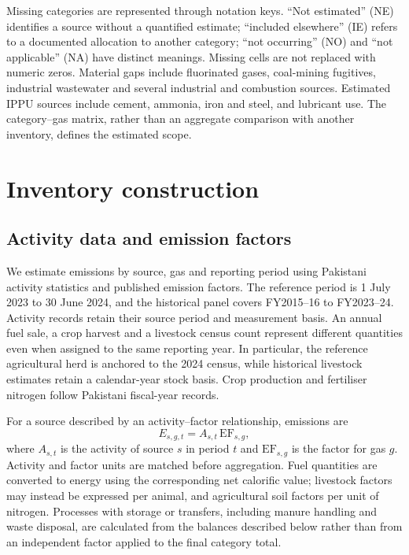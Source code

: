 \documentclass[essd]{copernicus}
\begin{document}
Missing categories are represented through notation keys. ``Not estimated'' (NE) identifies a source without a quantified estimate; ``included elsewhere'' (IE) refers to a documented allocation to another category; ``not occurring'' (NO) and ``not applicable'' (NA) have distinct meanings. Missing cells are not replaced with numeric zeros. Material gaps include fluorinated gases, coal-mining fugitives, industrial wastewater and several industrial and combustion sources. Estimated IPPU sources include cement, ammonia, iron and steel, and lubricant use. The category--gas matrix, rather than an aggregate comparison with another inventory, defines the estimated scope.

\section{Inventory construction}
\label{sec:methods}

\subsection{Activity data and emission factors}
\label{sec:activity_factors}

We estimate emissions by source, gas and reporting period using Pakistani activity statistics and published emission factors. The reference period is 1 July 2023 to 30 June 2024, and the historical panel covers FY2015--16 to FY2023--24. Activity records retain their source period and measurement basis. An annual fuel sale, a crop harvest and a livestock census count represent different quantities even when assigned to the same reporting year. In particular, the reference agricultural herd is anchored to the 2024 census, while historical livestock estimates retain a calendar-year stock basis. Crop production and fertiliser nitrogen follow Pakistani fiscal-year records.

For a source described by an activity--factor relationship, emissions are
\begin{equation}
 E_{s,g,t}=A_{s,t}\,\mathrm{EF}_{s,g},
 \label{eq:activity_factor}
\end{equation}
where $A_{s,t}$ is the activity of source $s$ in period $t$ and $\mathrm{EF}_{s,g}$ is the factor for gas $g$. Activity and factor units are matched before aggregation. Fuel quantities are converted to energy using the corresponding net calorific value; livestock factors may instead be expressed per animal, and agricultural soil factors per unit of nitrogen. Processes with storage or transfers, including manure handling and waste disposal, are calculated from the balances described below rather than from an independent factor applied to the final category total.
\end{document}
